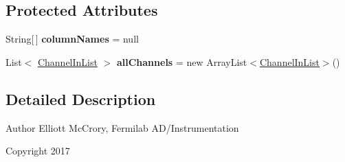 \subsection*{Protected Attributes}
\begin{DoxyCompactItemize}
\item 
\hypertarget{classgov_1_1fnal_1_1ppd_1_1dd_1_1channel_1_1list_1_1table_1_1AbstractChannelTableModel_a04eb656b0de2250db759665a3edc56a6}{String\mbox{[}$\,$\mbox{]} {\bfseries column\-Names} = null}\label{classgov_1_1fnal_1_1ppd_1_1dd_1_1channel_1_1list_1_1table_1_1AbstractChannelTableModel_a04eb656b0de2250db759665a3edc56a6}

\item 
\hypertarget{classgov_1_1fnal_1_1ppd_1_1dd_1_1channel_1_1list_1_1table_1_1AbstractChannelTableModel_a5fdecb28c6ee13eefbebf4588e1878d4}{List$<$ \hyperlink{classgov_1_1fnal_1_1ppd_1_1dd_1_1channel_1_1ChannelInList}{Channel\-In\-List} $>$ {\bfseries all\-Channels} = new Array\-List$<$\hyperlink{classgov_1_1fnal_1_1ppd_1_1dd_1_1channel_1_1ChannelInList}{Channel\-In\-List}$>$()}\label{classgov_1_1fnal_1_1ppd_1_1dd_1_1channel_1_1list_1_1table_1_1AbstractChannelTableModel_a5fdecb28c6ee13eefbebf4588e1878d4}

\end{DoxyCompactItemize}


\subsection{Detailed Description}
\begin{DoxyAuthor}{Author}
Elliott Mc\-Crory, Fermilab A\-D/\-Instrumentation 
\end{DoxyAuthor}
\begin{DoxyCopyright}{Copyright}
2017 
\end{DoxyCopyright}


